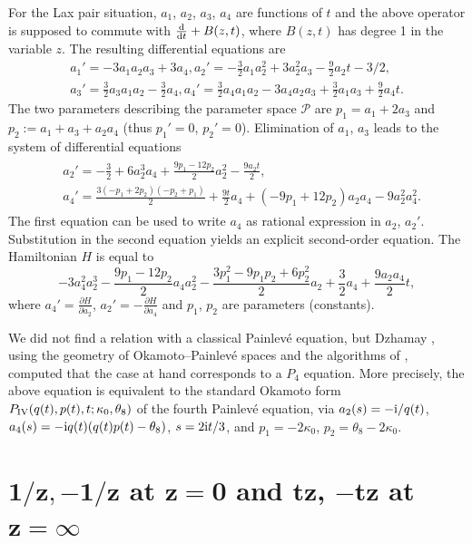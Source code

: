 \documentclass[pdftex]{sigma}
\numberwithin{equation}{section}
\begin{document}
For the Lax pair situation, $a_1$, $a_2$, $a_3$, $a_4$ are functions of $t$ and the above operator is supposed to commute with $\frac{{\rm d}}{{\rm d}t}+B(z,t)$, where
$B(z,t)$ has degree 1 in the variable $z$. The resulting differential equations are
\begin{gather*}
a_1' = -3a_1a_2a_3 + 3a_4, a_2' = -\frac{3}{2}a_1a_2^2 + 3a_2^2a_3 - \frac{9}{2}a_2t - 3/2,\\
 a_3' = \frac{3}{2}a_3a_1a_2 - \frac{3}{2}a_4, a_4' = \frac{3}{2}a_4a_1a_2 - 3a_4a_2a_3 + \frac{3}{2}a_1a_3 + \frac{9}{2}a_4t.\end{gather*}
The two parameters describing the parameter space
$\mathcal{P}$ are $p_1=a_1+2a_3$ and $p_2:=a_1+a_3+a_2a_4$ (thus $p_1'=0$, $p_2'=0$).
Elimination of $a_1$, $a_3$ leads to the system of differential equations
\begin{gather*}
\begin{split}
&a_2'=-\frac{3}{2}+6a_2^3a_4+\frac{9p_1-12p_2}{2}a_2^2-\frac{9a_2t}{2},\\
& a_4'=\frac{3(-p_1+2p_2)(-p_2+p_1)}{2} +\frac{9t}{2}a_4+(-9p_1+12p_2)a_2a_4-9a_2^2a_4^2.
\end{split}
\end{gather*}
 The first equation can be used to write $a_4$ as rational expression in $a_2$, $a_2'$. Substitution in the second equation yields
 an explicit second-order equation. The Hamiltonian $H$ is equal to
\[-3a_4^2a_2^3-\frac{9p_1-12p_2}{2}a_4a_2^2-\frac{3p_1^2-9p_1p_2+6p_2^2}{2}a_2+\frac{3}{2}a_4+\frac{9a_2a_4}{2}t,\]
 where $a_4'=\frac{\partial H}{\partial a_2}$, $a_2'=-\frac{\partial H}{\partial a_4}$ and $p_1$, $p_2$ are parameters (constants).

 We did not find a relation with a classical Painlev\'e equation, but
 Dzhamay \cite[Section~2]{Dz}, using the geometry of Okamoto--Painlev\'e spaces
 and the algorithms of \cite{D-F-L-S}, computed that the case at hand corresponds to a $P_4$ equation. More precisely, the above equation is equivalent to the standard Okamoto form $P_{\rm IV} (q(t), p(t), t; \kappa_0, \theta_8 ) $ of the fourth Painlev\'e equation,
 via
$a_2(s) = -{\rm i} / q(t)$,
$a_4(s) = - {\rm i} q(t) (q(t) p(t) - \theta_8)$,
$s = 2 {\rm i} t /3$, and $p_1 = - 2 \kappa_0$, $p_2 = \theta_8 - 2 \kappa_0$.

\section[1/z, -1/z at z=0 and tz, -tz at z=infty]{$\boldsymbol{1/z,-1/z}$ at $\boldsymbol{z=0}$ and $\boldsymbol{tz}$, $\boldsymbol{-tz}$ at $\boldsymbol{z=\infty }$}\label{sec11}
\end{document}
